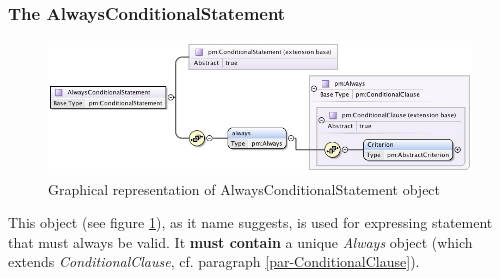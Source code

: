 \documentclass[a4paper,11pt] {ivoa}
\begin{document}
\subsubsection{The AlwaysConditionalStatement}\label{par-AlwaysConditionalStatement}
\begin{figure}[htbp]
\begin{center}
\includegraphics[width=1.1\textwidth]{pictures/AlwaysStatement.jpg} 
\caption{Graphical representation of AlwaysConditionalStatement object}
\label{Pic-AlwaysConditionalStatement}
\end{center}
\end{figure}
This object (see figure \ref{Pic-AlwaysConditionalStatement}), as it name suggests,  is used
for expressing statement that must always be valid. It {\bf must contain} a unique {\it Always}
object (which extends {\it ConditionalClause}, cf. paragraph \ref{par-ConditionalClause}).
\end{document}
